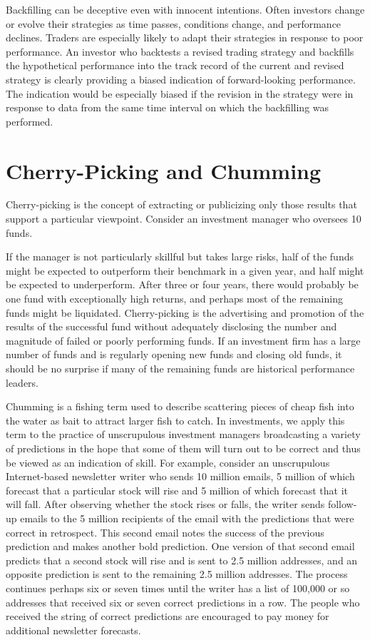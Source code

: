 \documentclass[11pt]{article}
\begin{document}
Backfilling can be deceptive even with innocent intentions. Often investors change or evolve their strategies as time passes, conditions change, and performance declines. Traders are especially likely to adapt their strategies in response to poor performance. An investor who backtests a revised trading strategy and backfills the hypothetical performance into the track record of the current and revised strategy is clearly providing a biased indication of forward-looking performance. The indication would be especially biased if the revision in the strategy were in response to data from the same time interval on which the backfilling was performed.

\section*{Cherry-Picking and Chumming}
Cherry-picking is the concept of extracting or publicizing only those results that support a particular viewpoint. Consider an investment manager who oversees 10 funds.

If the manager is not particularly skillful but takes large risks, half of the funds might be expected to outperform their benchmark in a given year, and half might be expected to underperform. After three or four years, there would probably be one fund with exceptionally high returns, and perhaps most of the remaining funds might be liquidated. Cherry-picking is the advertising and promotion of the results of the successful fund without adequately disclosing the number and magnitude of failed or poorly performing funds. If an investment firm has a large number of funds and is regularly opening new funds and closing old funds, it should be no surprise if many of the remaining funds are historical performance leaders.

Chumming is a fishing term used to describe scattering pieces of cheap fish into the water as bait to attract larger fish to catch. In investments, we apply this term to the practice of unscrupulous investment managers broadcasting a variety of predictions in the hope that some of them will turn out to be correct and thus be viewed as an indication of skill. For example, consider an unscrupulous Internet-based newsletter writer who sends 10 million emails, 5 million of which forecast that a particular stock will rise and 5 million of which forecast that it will fall. After observing whether the stock rises or falls, the writer sends follow-up emails to the 5 million recipients of the email with the predictions that were correct in retrospect. This second email notes the success of the previous prediction and makes another bold prediction. One version of that second email predicts that a second stock will rise and is sent to 2.5 million addresses, and an opposite prediction is sent to the remaining 2.5 million addresses. The process continues perhaps six or seven times until the writer has a list of 100,000 or so addresses that received six or seven correct predictions in a row. The people who received the string of correct predictions are encouraged to pay money for additional newsletter forecasts.
\end{document}

